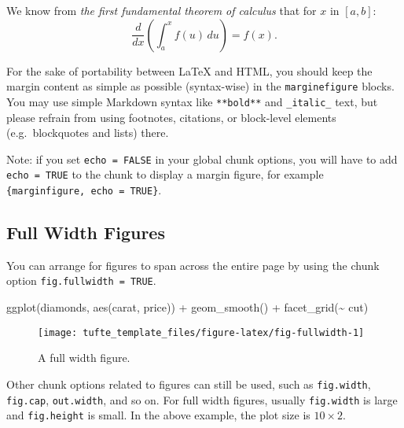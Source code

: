 \documentclass[a4paper,14pt]{tufte-handout}
\newenvironment{Shaded}{}{}
\newcommand{\FunctionTok}[1]{\textcolor[rgb]{0.02,0.16,0.49}{#1}}
\newcommand{\NormalTok}[1]{#1}
\newcommand{\SpecialCharTok}[1]{\textcolor[rgb]{0.25,0.44,0.63}{#1}}
\begin{document}
\begin{marginfigure}
We know from \emph{the first fundamental theorem of calculus} that for
\(x\) in \([a, b]\):
\[\frac{d}{dx}\left( \int_{a}^{x} f(u)\,du\right)=f(x).\]
\end{marginfigure}

For the sake of portability between LaTeX and HTML, you should keep the
margin content as simple as possible (syntax-wise) in the
\texttt{marginefigure} blocks. You may use simple Markdown syntax like
\texttt{**bold**} and \texttt{\_italic\_} text, but please refrain from
using footnotes, citations, or block-level elements (e.g.~blockquotes
and lists) there.

Note: if you set \texttt{echo\ =\ FALSE} in your global chunk options,
you will have to add \texttt{echo\ =\ TRUE} to the chunk to display a
margin figure, for example
\texttt{\textasciigrave{}\textasciigrave{}\textasciigrave{}\{marginfigure,\ echo\ =\ TRUE\}}.

\hypertarget{full-width-figures}{%
\subsection{Full Width Figures}\label{full-width-figures}}

You can arrange for figures to span across the entire page by using the
chunk option \texttt{fig.fullwidth\ =\ TRUE}.

\begin{Shaded}
\begin{Highlighting}[numbers=left,,]
\FunctionTok{ggplot}\NormalTok{(diamonds, }\FunctionTok{aes}\NormalTok{(carat, price)) }\SpecialCharTok{+} \FunctionTok{geom\_smooth}\NormalTok{() }\SpecialCharTok{+}
  \FunctionTok{facet\_grid}\NormalTok{(}\SpecialCharTok{\textasciitilde{}}\NormalTok{ cut)}
\end{Highlighting}
\end{Shaded}

\begin{figure*}

{\centering \texttt{[image: tufte\_template\_files/figure-latex/fig-fullwidth-1]} 

}

\caption[A full width figure]{A full width figure.}\label{fig:fig-fullwidth}
\end{figure*}

Other chunk options related to figures can still be used, such as
\texttt{fig.width}, \texttt{fig.cap}, \texttt{out.width}, and so on. For
full width figures, usually \texttt{fig.width} is large and
\texttt{fig.height} is small. In the above example, the plot size is
\(10 \times 2\).
\end{document}
